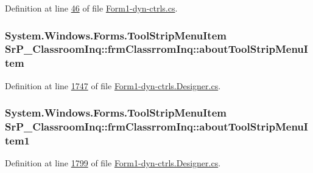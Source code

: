 \-Definition at line \hyperlink{_form1-dyn-ctrls_8cs_source_l00046}{46} of file \hyperlink{_form1-dyn-ctrls_8cs_source}{\-Form1-\/dyn-\/ctrls.\-cs}.

\hypertarget{class_sr_p___classroom_inq_1_1frm_classrrom_inq_a91d70ebcd0a0ce1237f845c90919cc8b}{
\subsubsection[{about\-Tool\-Strip\-Menu\-Item}]{\setlength{\rightskip}{0pt plus 5cm}\-System.\-Windows.\-Forms.\-Tool\-Strip\-Menu\-Item {\bf \-Sr\-P\-\_\-\-Classroom\-Inq\-::frm\-Classrrom\-Inq\-::about\-Tool\-Strip\-Menu\-Item}}}
\label{class_sr_p___classroom_inq_1_1frm_classrrom_inq_a91d70ebcd0a0ce1237f845c90919cc8b}


\-Definition at line \hyperlink{_form1-dyn-ctrls_8_designer_8cs_source_l01747}{1747} of file \hyperlink{_form1-dyn-ctrls_8_designer_8cs_source}{\-Form1-\/dyn-\/ctrls.\-Designer.\-cs}.

\hypertarget{class_sr_p___classroom_inq_1_1frm_classrrom_inq_ab34838f16ac4c613949fc6e6b18e972d}{
\subsubsection[{about\-Tool\-Strip\-Menu\-Item1}]{\setlength{\rightskip}{0pt plus 5cm}\-System.\-Windows.\-Forms.\-Tool\-Strip\-Menu\-Item {\bf \-Sr\-P\-\_\-\-Classroom\-Inq\-::frm\-Classrrom\-Inq\-::about\-Tool\-Strip\-Menu\-Item1}}}
\label{class_sr_p___classroom_inq_1_1frm_classrrom_inq_ab34838f16ac4c613949fc6e6b18e972d}


\-Definition at line \hyperlink{_form1-dyn-ctrls_8_designer_8cs_source_l01799}{1799} of file \hyperlink{_form1-dyn-ctrls_8_designer_8cs_source}{\-Form1-\/dyn-\/ctrls.\-Designer.\-cs}.

